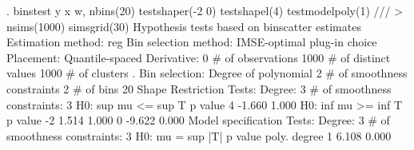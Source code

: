 . binstest y x w, nbins(20) testshaper(-2 0) testshapel(4) testmodelpoly(1) ///
>                    nsims(1000) simsgrid(30)
{\smallskip}
Hypothesis tests based on binscatter estimates
Estimation method: reg
Bin selection method: IMSE-optimal plug-in choice
Placement: Quantile-spaced
Derivative: 0
{\smallskip}
\# of observations             {\VBAR}    1000
\# of distinct values          {\VBAR}    1000
\# of clusters                 {\VBAR}       .
Bin selection:                {\VBAR} 
         Degree of polynomial {\VBAR}       2
  \# of smoothness constraints {\VBAR}       2
                    \# of bins {\VBAR}      20
{\smallskip}
Shape Restriction Tests:
Degree: 3     \# of smoothness constraints: 3
{\smallskip}
H0: sup mu <=      {\VBAR} sup T             p value
         4         {\VBAR}  -1.660             1.000
{\smallskip}
H0: inf mu >=      {\VBAR} inf T             p value
         -2        {\VBAR}   1.514             1.000
         0         {\VBAR}  -9.622             0.000
{\smallskip}
Model specification Tests:
Degree: 3     \# of smoothness constraints: 3
{\smallskip}
H0: mu =           {\VBAR} sup |T|           p value
poly. degree  1    {\VBAR}   6.108             0.000
